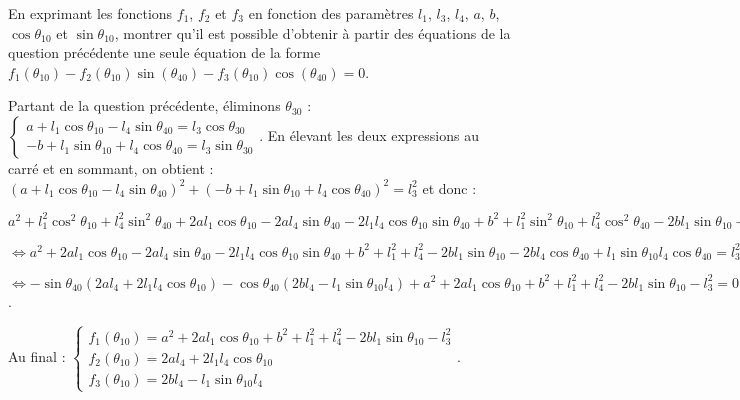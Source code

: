 \documentclass[11pt]{article}
\begin{document}
\UPSTIquestion  En exprimant les fonctions $f_1$, $f_2$ et $f_3$ en fonction des paramètres $l_1$, $l_3$, $l_4$, $a$, $b$, $\cos\theta_{10}$ et $\sin \theta_{10}$, montrer qu’il est possible d’obtenir à partir des équations de la question précédente une seule équation de la forme $f_1\left(\theta_{10}\right) - f_2\left(\theta_{10}\right) \sin \left(\theta_{40}\right) - f_3 \left(\theta_{10}\right) \cos \left(\theta_{40}\right)=0$.

\begin{UPSTIcorrige}
Partant de la question précédente, éliminons $\theta_{30}$ :
$
\left\{ 
\begin{array}{l}
a   +l_1  \cos\theta_{10} -  l_4  \sin\theta_{40}   = l_3 \cos\theta_{30}  \\
- b +l_1  \sin\theta_{10} + l_4  \cos \theta_{40}  = l_3  \sin\theta_{30}   
\end{array}
\right.
$.
En élevant les deux expressions au carré et en sommant, on obtient : 
$\left(a   +l_1  \cos\theta_{10} -  l_4  \sin\theta_{40} \right)^2 + 
\left(- b +l_1  \sin\theta_{10} + l_4  \cos \theta_{40}\right)^2 = l_3^2$ et donc : 

$a^2   +l_1^2  \cos^2\theta_{10} +  l_4^2  \sin^2\theta_{40} 
+ 2al_1\cos\theta_{10} - 2a  l_4  \sin\theta_{40} - 2l_1l_4 \cos\theta_{10}\sin\theta_{40}
+b^2 + l_1^2  \sin^2\theta_{10} + l_4 ^2 \cos^2 \theta_{40}
- 2bl_1  \sin\theta_{10} - 2b l_4  \cos \theta_{40} + l_1  \sin\theta_{10}l_4  \cos \theta_{40}  = l_3^2$ 

$ \Leftrightarrow 
a^2     
+ 2al_1\cos\theta_{10} - 2a  l_4  \sin\theta_{40} - 2l_1l_4 \cos\theta_{10}\sin\theta_{40}
+b^2 + l_1^2  + l_4 ^2 - 2bl_1  \sin\theta_{10} - 2b l_4  \cos \theta_{40} + l_1  \sin\theta_{10}l_4  \cos \theta_{40}  = l_3^2$ 

$ \Leftrightarrow 
-\sin\theta_{40}\left( 2a  l_4  + 2l_1l_4 \cos\theta_{10}\right)  
-\cos \theta_{40}\left( 2b l_4   - l_1  \sin\theta_{10}l_4  \right)
+a^2  + 2al_1\cos\theta_{10}  +b^2 + l_1^2  + l_4 ^2 - 2bl_1  \sin\theta_{10}   - l_3^2 = 0$.

Au final : 
$\left\{
\begin{array}{l}
 f_1\left(\theta_{10}\right) =a^2  + 2al_1\cos\theta_{10}  +b^2 + l_1^2  + l_4 ^2 - 2bl_1  \sin\theta_{10}   - l_3^2  \\
 f_2\left(\theta_{10}\right) =2a  l_4  + 2l_1l_4 \cos\theta_{10} \\
 f_3\left(\theta_{10}\right) = 2b l_4   - l_1  \sin\theta_{10}l_4 
\end{array}
\right.
$.


\end{UPSTIcorrige}
\end{document}
